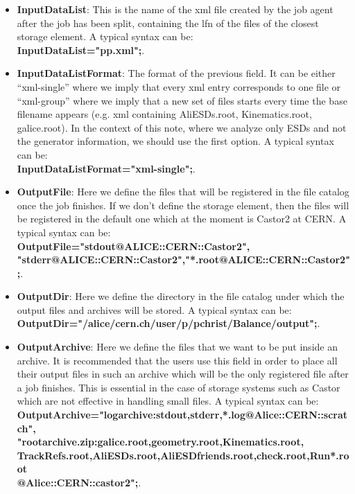 \begin{itemize}
\item \textbf{InputDataList}: This is the name of the xml file created by the job agent after the job has been split, containing the lfn of the files of the closest storage element. A typical syntax can be: \\{\ttfamily \textbf{InputDataList="pp.xml";}}.

\item \textbf{InputDataListFormat}: The format of the previous field. It can be either ``xml-single'' where we imply that every xml entry corresponds to one file or ``xml-group'' where we imply that a new set of files starts every time the base filename appears (e.g. xml containing AliESDs.root, Kinematics.root, galice.root). In the context of this note, where we analyze only ESDs and not the generator information, we should use the first option. A typical syntax can be: \\{\ttfamily \textbf{InputDataListFormat="xml-single";}}. 

\item \textbf{OutputFile}: Here we define the files that will be registered in the file catalog once the job finishes. If we don't define the storage element, then the files will be registered in the default one which at the moment is Castor2 at CERN. A typical syntax can be: \\{\ttfamily \textbf{OutputFile={"stdout@ALICE::CERN::Castor2",\\"stderr@ALICE::CERN::Castor2","*.root@ALICE::CERN::Castor2"};}}. 

\item \textbf{OutputDir}: Here we define the directory in the file catalog under which the output files and archives will be stored. A typical syntax can be: \\{\ttfamily \textbf{OutputDir="/alice/cern.ch/user/p/pchrist/Balance/output";}}.

\item \textbf{OutputArchive}: Here we define the files that we want to be put inside an archive. It is recommended that the users use this field in order to place all their output files in such an archive which will be the only registered file after a job finishes. This is essential in the case of storage systems such as Castor which are not effective in handling small files. A typical syntax can be: \\{\ttfamily \textbf{OutputArchive={"logarchive:stdout,stderr,*.log@Alice::CERN::scratch",\\"rootarchive.zip:galice.root,geometry.root,Kinematics.root,\\TrackRefs.root,AliESDs.root,AliESDfriends.root,check.root,Run*.root\\@Alice::CERN::castor2"};}}.


\end{itemize}
